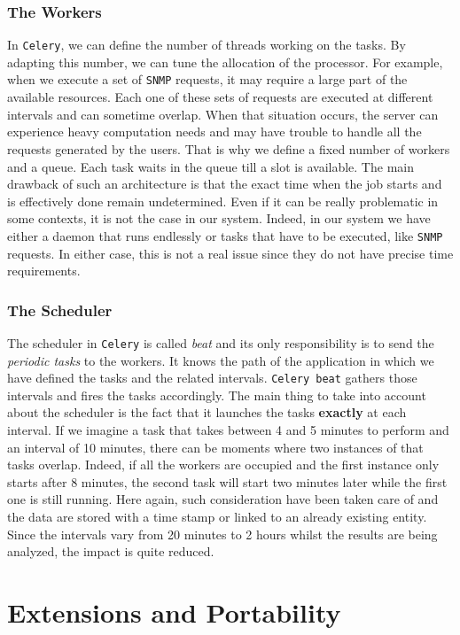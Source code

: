 \subsubsection*{The Workers}
In \texttt{Celery}, we can define the number of threads working on the tasks. By adapting this number, we can tune the allocation of the processor. For example, when we execute a set of \texttt{SNMP} requests, it may require a large part of the available resources. Each one of these sets of requests are executed at different intervals and can sometime overlap. When that situation occurs, the server can experience heavy computation needs and may have trouble to handle all the requests generated by the users. That is why we define a fixed number of workers and a queue. Each task waits in the queue till a slot is available. The main drawback of such an architecture is that the exact time when the job starts and is effectively done remain undetermined. Even if it can be really problematic in some contexts, it is not the case in our system. Indeed, in our system we have either a daemon that runs endlessly or tasks that have to be executed, like \texttt{SNMP} requests. In either case, this is not a real issue since they do not have precise time requirements. 


\subsubsection*{The Scheduler}
The scheduler in \texttt{Celery} is called \emph{beat} and its only responsibility is to send the \emph{periodic tasks} to the workers. It knows the path of the application in which we have defined the tasks and the related intervals. \texttt{Celery beat} gathers those intervals and fires the tasks accordingly. The main thing to take into account about the scheduler is the fact that it launches the tasks \textbf{exactly} at each interval. If we imagine a task that takes between 4 and 5 minutes to perform and an interval of 10 minutes, there can be moments where two instances of that tasks overlap. Indeed, if all the workers are occupied and the first instance only starts after 8 minutes, the second task will start two minutes later while the first one is still running. Here again, such consideration have been taken care of and the data are stored with a time stamp or linked to an already existing entity. Since the intervals vary from 20 minutes to 2 hours whilst the results are being analyzed, the impact is quite reduced. 

\section{Extensions and Portability}

